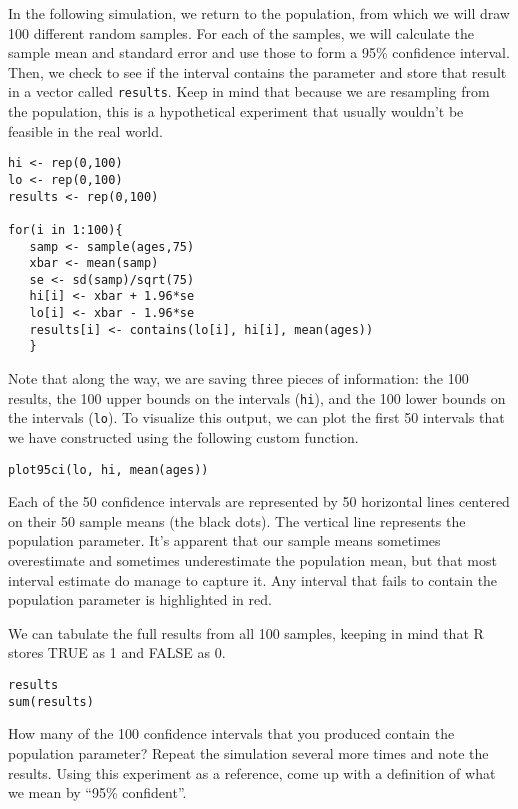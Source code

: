 \documentclass[11pt]{article}
\begin{document}
In the following simulation, we return to the population, from which we will draw 100 different random samples.  For each of the samples, we will calculate the sample mean and standard error and use those to form a 95\% confidence interval.  Then, we check to see if the interval contains the parameter and store that result in a vector called \texttt{results}.  Keep in mind that because we are resampling from the population, this is a hypothetical experiment that usually wouldn't be feasible in the real world.

\begin{lstlisting}
hi <- rep(0,100)
lo <- rep(0,100)
results <- rep(0,100)

for(i in 1:100){
   samp <- sample(ages,75)
   xbar <- mean(samp)
   se <- sd(samp)/sqrt(75)
   hi[i] <- xbar + 1.96*se
   lo[i] <- xbar - 1.96*se
   results[i] <- contains(lo[i], hi[i], mean(ages))
   }
\end{lstlisting}

Note that along the way, we are saving three pieces of information: the 100 results, the 100 upper bounds on the intervals (\texttt{hi}), and the 100 lower bounds on the intervals (\texttt{lo}).  To visualize this output, we can plot the first 50 intervals that we have constructed using the following custom function.

\begin{lstlisting}
plot95ci(lo, hi, mean(ages))
\end{lstlisting}

Each of the 50 confidence intervals are represented by 50 horizontal lines centered on their 50 sample means (the black dots).  The vertical line represents the population parameter.  It's apparent that our sample means sometimes overestimate and sometimes underestimate the population mean, but that most interval estimate do manage to capture it.  Any interval that fails to contain the population parameter is highlighted in red.

We can tabulate the full results from all 100 samples, keeping in mind that R stores TRUE as 1 and FALSE as 0.

\begin{lstlisting}
results
sum(results)
\end{lstlisting}

\begin{exercise}
How many of the 100 confidence intervals that you produced contain the population parameter?  Repeat the simulation several more times and note the results.  Using this experiment as a reference, come up with a definition of what we mean by ``95\% confident''.
\end{exercise}
\end{document}
